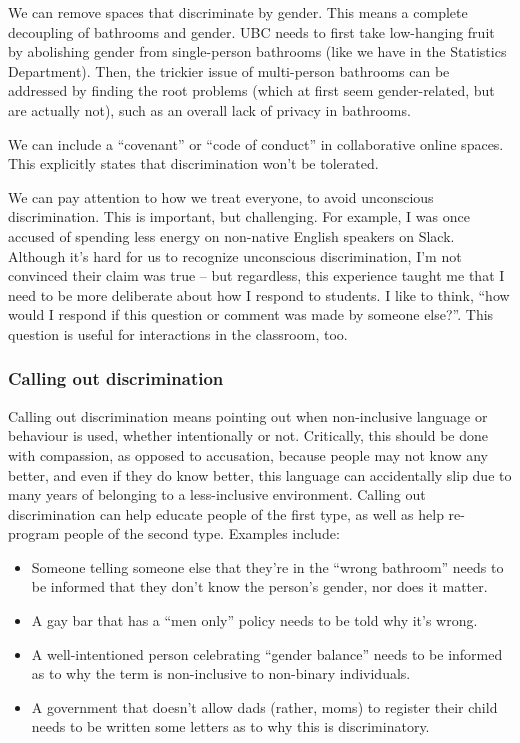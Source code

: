 \documentclass[]{article}
\providecommand{\tightlist}{%
  \setlength{\itemsep}{0pt}\setlength{\parskip}{0pt}}
\begin{document}
We can remove spaces that discriminate by gender. This means a complete decoupling of bathrooms and gender. UBC needs to first take low-hanging fruit by abolishing gender from single-person bathrooms (like we have in the Statistics Department). Then, the trickier issue of multi-person bathrooms can be addressed by finding the root problems (which at first seem gender-related, but are actually not), such as an overall lack of privacy in bathrooms.

We can include a ``covenant'' or ``code of conduct'' in collaborative online spaces. This explicitly states that discrimination won't be tolerated.

We can pay attention to how we treat everyone, to avoid unconscious discrimination. This is important, but challenging. For example, I was once accused of spending less energy on non-native English speakers on Slack. Although it's hard for us to recognize unconscious discrimination, I'm not convinced their claim was true -- but regardless, this experience taught me that I need to be more deliberate about how I respond to students. I like to think, ``how would I respond if this question or comment was made by someone else?''. This question is useful for interactions in the classroom, too.

\hypertarget{calling-out-discrimination}{%
\subsubsection{Calling out discrimination}\label{calling-out-discrimination}}

Calling out discrimination means pointing out when non-inclusive language or behaviour is used, whether intentionally or not. Critically, this should be done with compassion, as opposed to accusation, because people may not know any better, and even if they do know better, this language can accidentally slip due to many years of belonging to a less-inclusive environment. Calling out discrimination can help educate people of the first type, as well as help re-program people of the second type. Examples include:

\begin{itemize}
\tightlist
\item
  Someone telling someone else that they're in the ``wrong bathroom'' needs to be informed that they don't know the person's gender, nor does it matter.
\item
  A gay bar that has a ``men only'' policy needs to be told why it's wrong.
\item
  A well-intentioned person celebrating ``gender balance'' needs to be informed as to why the term is non-inclusive to non-binary individuals.
\item
  A government that doesn't allow dads (rather, moms) to register their child needs to be written some letters as to why this is discriminatory.
\end{itemize}
\end{document}

